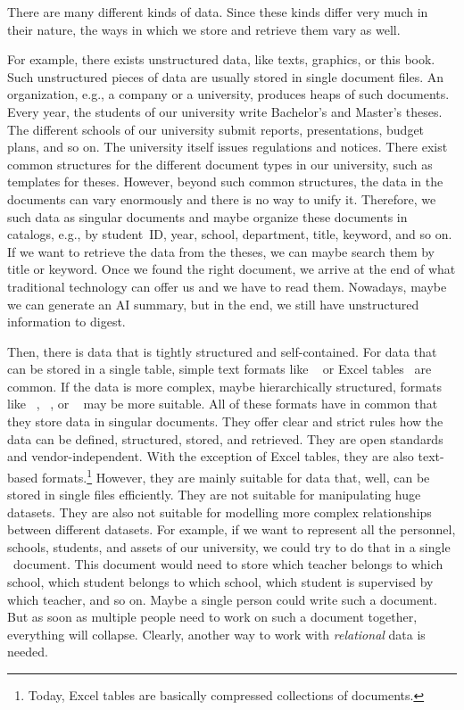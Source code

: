 \hsection{}%
%
%
There are many different kinds of data.%
Since these kinds differ very much in their nature, the ways in which we store and retrieve them vary as well.

For example, there exists unstructured data, like texts, graphics, or this book.
Such unstructured pieces of data are usually stored in single document files.
An organization, e.g., a company or a university, produces heaps of such documents.
Every year, the students of our university write Bachelor's and Master's theses.
The different schools of our university submit reports, presentations, budget plans, and so on.
The university itself issues regulations and notices.
There exist common structures for the different document types in our university, such as templates for theses.
However, beyond such common structures, the data in the documents can vary enormously and there is no way to unify it.
Therefore, we  such data as singular documents and maybe organize these documents in catalogs, e.g., by student~ID, year, school, department, title, keyword, and so on.
If we want to retrieve the data from the theses, we can maybe search them by title or keyword.
Once we found the right document, we arrive at the end of what traditional technology can offer us and we have to read them.
Nowadays, maybe we can generate an AI summary, but in the end, we still have unstructured information to digest.

Then, there is data that is tightly structured and self-contained.
For data that can be stored in a single table, simple text formats like ~\cite{RFC4180} or Excel tables~\cite{B2023DMWME,G2024ECRFMME} are common.
If the data is more complex, maybe hierarchically structured, formats like ~\cite{BPSMM2008EMLX1FE,K2019ITXJY,CH2013XFCAMLTMC}, ~\cite{E2017SE4TJDIS,RFC8259}, or ~\cite{DNMAASBE2021YAMLYV1,K2019ITXJY,CGTYB2022YFFDCAIE} may be more suitable.
All of these formats have in common that they store data in singular documents.
They offer clear and strict rules how the data can be defined, structured, stored, and retrieved.
They are open standards and vendor-independent.
With the exception of Excel tables, they are also text-based formats.\footnote{%
Today, Excel tables are basically compressed collections of  documents.%
} %
However, they are mainly suitable for data that, well, can be stored in single files efficiently.
They are not suitable for manipulating huge datasets.
They are also not suitable for modelling more complex relationships between different datasets.
For example, if we want to represent all the personnel, schools, students, and assets of our university, we could try to do that in a single ~document.
This document would need to store which teacher belongs to which school, which student belongs to which school, which student is supervised by which teacher, and so on.
Maybe a single person could write such a document.
But as soon as multiple people need to work on such a document together, everything will collapse.
Clearly, another way to work with \emph{relational} data is needed.

